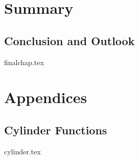 \documentclass[UKenglish]{texmex/uiomasterthesis}
\begin{document}
{%


\part*{Summary} %


\chapter{Conclusion and Outlook}\label{chap:finalchap}
    {{finalchap.tex}}



}














\backmatter{}






\part*{Appendices}

\appendix



\chapter{Cylinder Functions}\label{app:cylinder}
    {{cylinder.tex}}
\end{document}

